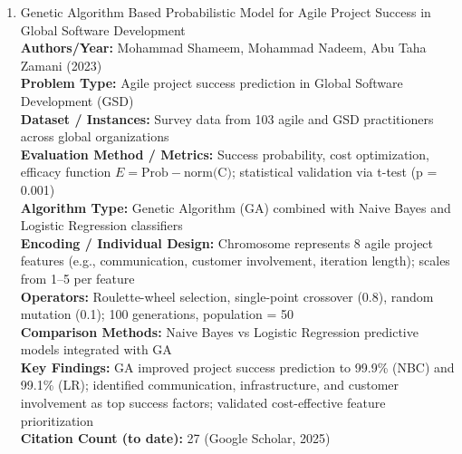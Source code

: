 \documentclass[a4paper,12pt]{article}
\begin{document}
\begin{enumerate}[leftmargin=2em, labelwidth=1em, labelsep=0.5em, itemsep=1ex]
  \item Genetic Algorithm Based Probabilistic Model for Agile Project Success in Global Software Development \\
    \textbf{Authors/Year:} Mohammad Shameem, Mohammad Nadeem, Abu Taha Zamani (2023) \\  
    \textbf{Problem Type:} Agile project success prediction in Global Software Development (GSD) \\  
    \textbf{Dataset / Instances:} Survey data from 103 agile and GSD practitioners across global organizations \\  
    \textbf{Evaluation Method / Metrics:} Success probability, cost optimization, efficacy function $E = \text{Prob} - \text{norm(C)}$; statistical validation via t-test (p = 0.001) \\  
    \textbf{Algorithm Type:} Genetic Algorithm (GA) combined with Naive Bayes and Logistic Regression classifiers \\  
    \textbf{Encoding / Individual Design:} Chromosome represents 8 agile project features (e.g., communication, customer involvement, iteration length); scales from 1–5 per feature \\  
    \textbf{Operators:} Roulette-wheel selection, single-point crossover (0.8), random mutation (0.1); 100 generations, population = 50 \\  
    \textbf{Comparison Methods:} Naive Bayes vs Logistic Regression predictive models integrated with GA \\  
    \textbf{Key Findings:} GA improved project success prediction to 99.9\% (NBC) and 99.1\% (LR); identified communication, infrastructure, and customer involvement as top success factors; validated cost-effective feature prioritization \\  
    \textbf{Citation Count (to date):} 27 (Google Scholar, 2025) \\[2ex]
  

\end{enumerate}
\end{document}
